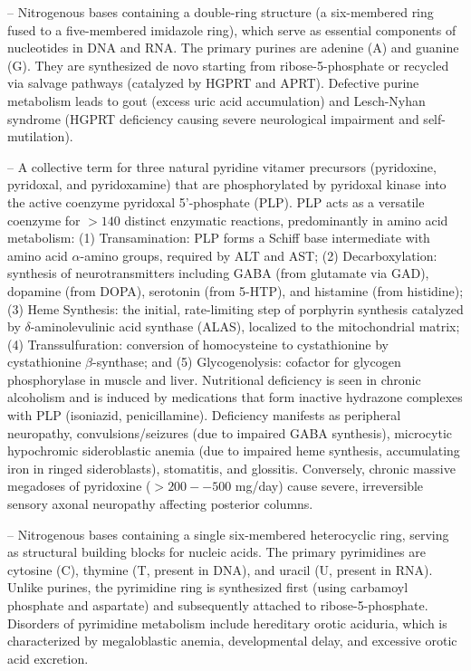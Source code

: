 -- Nitrogenous bases containing a double-ring structure (a six-membered ring fused to a five-membered imidazole ring), which serve as essential components of nucleotides in DNA and RNA. The primary purines are adenine (A) and guanine (G). They are synthesized de novo starting from ribose-5-phosphate or recycled via salvage pathways (catalyzed by HGPRT and APRT). Defective purine metabolism leads to gout (excess uric acid accumulation) and Lesch-Nyhan syndrome (HGPRT deficiency causing severe neurological impairment and self-mutilation).

-- A collective term for three natural pyridine vitamer precursors (pyridoxine, pyridoxal, and pyridoxamine) that are phosphorylated by pyridoxal kinase into the active coenzyme pyridoxal 5'-phosphate (PLP). PLP acts as a versatile coenzyme for $>140$ distinct enzymatic reactions, predominantly in amino acid metabolism: (1) Transamination: PLP forms a Schiff base intermediate with amino acid $\alpha$-amino groups, required by ALT and AST; (2) Decarboxylation: synthesis of neurotransmitters including GABA (from glutamate via GAD), dopamine (from DOPA), serotonin (from 5-HTP), and histamine (from histidine); (3) Heme Synthesis: the initial, rate-limiting step of porphyrin synthesis catalyzed by $\delta$-aminolevulinic acid synthase (ALAS), localized to the mitochondrial matrix; (4) Transsulfuration: conversion of homocysteine to cystathionine by cystathionine $\beta$-synthase; and (5) Glycogenolysis: cofactor for glycogen phosphorylase in muscle and liver. Nutritional deficiency is seen in chronic alcoholism and is induced by medications that form inactive hydrazone complexes with PLP (isoniazid, penicillamine). Deficiency manifests as peripheral neuropathy, convulsions/seizures (due to impaired GABA synthesis), microcytic hypochromic sideroblastic anemia (due to impaired heme synthesis, accumulating iron in ringed sideroblasts), stomatitis, and glossitis. Conversely, chronic massive megadoses of pyridoxine ($>200--500$ mg/day) cause severe, irreversible sensory axonal neuropathy affecting posterior columns.

-- Nitrogenous bases containing a single six-membered heterocyclic ring, serving as structural building blocks for nucleic acids. The primary pyrimidines are cytosine (C), thymine (T, present in DNA), and uracil (U, present in RNA). Unlike purines, the pyrimidine ring is synthesized first (using carbamoyl phosphate and aspartate) and subsequently attached to ribose-5-phosphate. Disorders of pyrimidine metabolism include hereditary orotic aciduria, which is characterized by megaloblastic anemia, developmental delay, and excessive orotic acid excretion.

